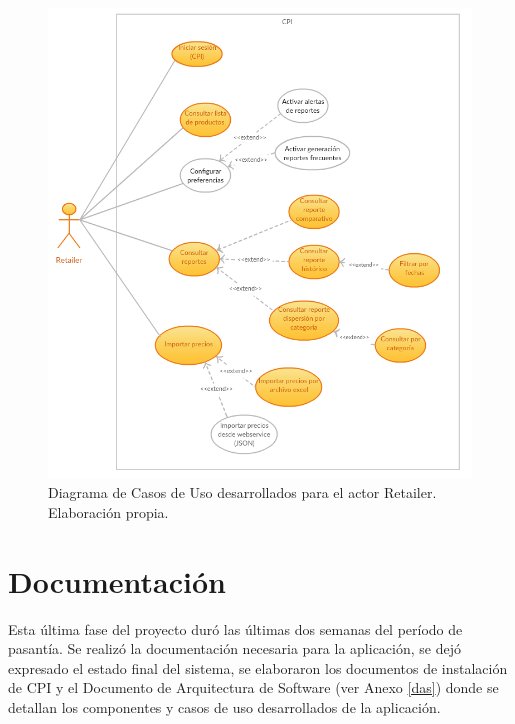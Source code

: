 \begin{figure}[H]
    \begin{center}
    \includegraphics[width=\textwidth]{cu_retailer.png}
    \caption{Diagrama de Casos de Uso desarrollados para el actor Retailer. Elaboración propia.}
    \label{fig:cu_retailer}
    \end{center}
\end{figure}

\section{Documentación} \label{documentation}
Esta última fase del proyecto duró las últimas dos semanas del período de pasantía. Se realizó la documentación necesaria para la aplicación, se dejó expresado el estado final del sistema, se elaboraron los documentos de instalación de CPI y el Documento de Arquitectura de Software (ver Anexo \ref{das}) donde se detallan los componentes y casos de uso desarrollados de la aplicación.
